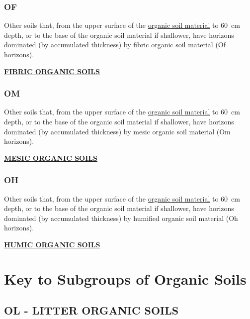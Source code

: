 \documentclass[
  letterpaper,
  DIV=11,
  numbers=noendperiod]{scrreprt}
\begin{document}
\hypertarget{sec-key-OF}{%
\subsubsection{\texorpdfstring{\textbf{OF}}{OF}}\label{sec-key-OF}}

Other soils that, from the upper surface of the
\protect\hyperlink{sec-diag-org}{organic soil material} to 60~cm depth,
or to the base of the organic soil material if shallower, have horizons
dominated (by accumulated thickness) by fibric organic soil material (Of
horizons).

\protect\hyperlink{sec-OF}{\textbf{FIBRIC ORGANIC SOILS}}

\hypertarget{sec-key-OM}{%
\subsubsection{\texorpdfstring{\textbf{OM}}{OM}}\label{sec-key-OM}}

Other soils that, from the upper surface of the
\protect\hyperlink{sec-diag-org}{organic soil material} to 60~cm depth,
or to the base of the organic soil material if shallower, have horizons
dominated (by accumulated thickness) by mesic organic soil material (Om
horizons).

\protect\hyperlink{sec-OM}{\textbf{MESIC ORGANIC SOILS}}

\hypertarget{sec-key-OH}{%
\subsubsection{\texorpdfstring{\textbf{OH}}{OH}}\label{sec-key-OH}}

Other soils that, from the upper surface of the
\protect\hyperlink{sec-diag-org}{organic soil material} to 60~cm depth,
or to the base of the organic soil material if shallower, have horizons
dominated (by accumulated thickness) by humified organic soil material
(Oh horizons).

\protect\hyperlink{sec-OH}{\textbf{HUMIC ORGANIC SOILS}}

\hypertarget{sec-sub-O}{%
\section{Key to Subgroups of Organic Soils}\label{sec-sub-O}}

\hypertarget{sec-OL}{%
\subsection{\texorpdfstring{\textbf{OL} - LITTER ORGANIC
SOILS}{OL - LITTER ORGANIC SOILS}}\label{sec-OL}}
\end{document}
